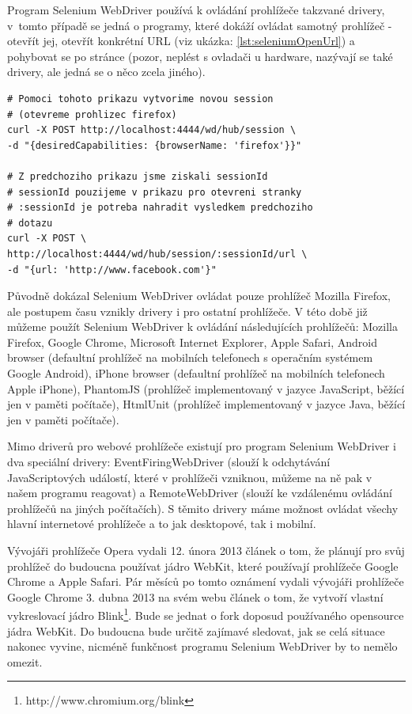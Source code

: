 \documentclass[thesis=M,czech]{FITthesis}[2013/05/10]
\begin{document}
Program Selenium WebDriver používá k ovládání prohlížeče takzvané drivery, v~tomto případě se jedná o programy, které dokáží ovládat samotný prohlížeč - otevřít jej, otevřít konkrétní URL (viz ukázka: \ref{lst:seleniumOpenUrl}) a pohybovat se po stránce (pozor, neplést s ovladači u hardware, nazývají se také drivery, ale jedná se o něco zcela jiného). 

\begin{lstlisting}[caption={Příklad otevření URL v programu Selenium WebDriver pomocí cURL},label=lst:seleniumOpenUrl,belowcaptionskip=0.4cm]
# Pomoci tohoto prikazu vytvorime novou session 
# (otevreme prohlizec firefox)
curl -X POST http://localhost:4444/wd/hub/session \
-d "{desiredCapabilities: {browserName: 'firefox'}}"

# Z predchoziho prikazu jsme ziskali sessionId
# sessionId pouzijeme v prikazu pro otevreni stranky
# :sessionId je potreba nahradit vysledkem predchoziho
# dotazu
curl -X POST \
http://localhost:4444/wd/hub/session/:sessionId/url \
-d "{url: 'http://www.facebook.com'}" 
\end{lstlisting}

Původně dokázal Selenium WebDriver ovládat pouze prohlížeč Mozilla Firefox, ale postupem času vznikly drivery i pro ostatní prohlížeče. V této době již můžeme použít Selenium WebDriver k ovládání následujících prohlížečů: Mozilla Firefox, Google Chrome, Microsoft Internet Explorer, Apple Safari, Android browser (defaultní prohlížeč na mobilních telefonech s operačním systémem Google Android), iPhone browser (defaultní prohlížeč na mobilních telefonech Apple iPhone), PhantomJS (prohlížeč implementovaný v jazyce JavaScript, běžící jen v paměti počítače), HtmlUnit (prohlížeč implementovaný v jazyce Java, běžící jen v paměti počítače). 

Mimo driverů pro webové prohlížeče existují pro program Selenium WebDriver i dva speciální drivery: EventFiringWebDriver (slouží k odchytávání JavaScriptových událostí, které v prohlížeči vzniknou, můžeme na ně pak v našem programu reagovat) a RemoteWebDriver (slouží ke vzdálenému ovládání prohlížečů na jiných počítačích). S těmito drivery máme možnost ovládat všechy hlavní internetové prohlížeče a to jak desktopové, tak i mobilní.

Vývojáři prohlížeče Opera vydali 12. února 2013 
článek \cite{operaMovesToWebkit} o tom, že plánují pro svůj prohlížeč do budoucna používat jádro WebKit, které používají prohlížeče Google Chrome a Apple Safari. Pár měsíců po tomto oznámení vydali vývojáři prohlížeče Google Chrome 3. dubna 2013 na svém webu článek \cite{chromiumBlink} o tom, že vytvoří vlastní vykreslovací jádro Blink\footnote{http://www.chromium.org/blink}. Bude se jednat o fork doposud používaného opensource jádra WebKit. Do budoucna bude určitě zajímavé sledovat, jak se celá situace nakonec vyvine, nicméně funkčnost programu Selenium WebDriver by to nemělo omezit.
\end{document}
